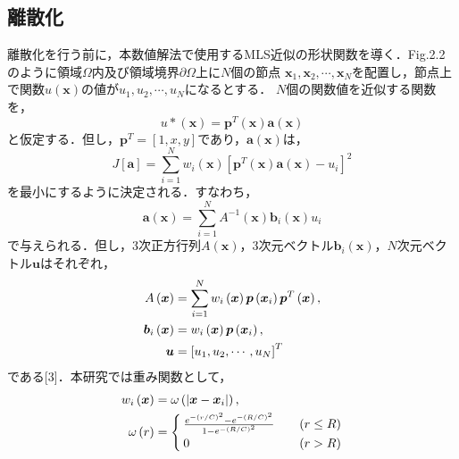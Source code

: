 \documentclass[twocolumn,head_space=15.0mm,foot_space=15.0mm,fleqn]{jlreq}
\numberwithin{equation}{section}
\begin{document}
\subsection{離散化}
離散化を行う前に，本数値解法で使用するMLS近似の形状関数を導く．Fig.2.2のように領域$\Omega$内及び領域境界$\partial \Omega$上に$N$個の節点
$\boldsymbol{x}_1, \boldsymbol{x}_2, \cdots, \boldsymbol{x}_N$を配置し，節点上で関数$u\left( \boldsymbol{x} \right)$の値が$u_1, u_2, \cdots, u_N$になるとする．
$N$個の関数値を近似する関数を，
\begin{equation}
	u* \left( \boldsymbol{x} \right) = \boldsymbol{p}^T \left( \boldsymbol{x} \right) \boldsymbol{a} \left( \boldsymbol{x} \right)
\end{equation}
と仮定する．但し，$\boldsymbol{p}^T = \left[ 1,x,y \right]$であり，$\boldsymbol{a} \left( \boldsymbol{x} \right)$は，
\begin{equation*}
	J \left[ \boldsymbol{a} \right] = \sum_{i=1}^N w_i \left( \boldsymbol{x} \right) 
	\left[ \boldsymbol{p}^T \left( \boldsymbol{x} \right) \boldsymbol{a} \left( \boldsymbol{x} \right) - u_i \right]^2
\end{equation*}
を最小にするように決定される．すなわち，
\begin{equation}
	\boldsymbol{a} \left( \boldsymbol{x} \right) = \sum_{i=1}^N A^{-1} \left( \boldsymbol{x} \right) \boldsymbol{b}_i \left( \boldsymbol{x} \right) u_i
\end{equation}
で与えられる．但し，3次正方行列$A\left( \boldsymbol{x} \right)$，3次元ベクトル$\boldsymbol{b}_i \left( \boldsymbol{x} \right)$，$N$次元ベクトル$\boldsymbol{u}$はそれぞれ，
\begin{align}
	A \left( \boldsymbol{x} \right) &= \sum_{i=1}^N w_i \left( \boldsymbol{x} \right) \boldsymbol{p} \left( \boldsymbol{x}_i \right) \boldsymbol{p}^T \left( \boldsymbol{x} \right), \\
	\boldsymbol{b}_i \left( \boldsymbol{x} \right) &= w_i \left( \boldsymbol{x} \right) \boldsymbol{p} \left( \boldsymbol{x}_i \right), \\
	\boldsymbol{u} &= \left[ u_1, u_2, \cdots, u_N \right]^T \notag
\end{align}
である[3]．本研究では重み関数として，
\begin{align}
	w_i \left( \boldsymbol{x} \right) &= \omega \left( | \boldsymbol{x} - \boldsymbol{x}_i| \right), \\
	\omega \left( r \right) &=
	\begin{cases}
		\frac{ e^{-(r / C)^2} - e^{-(R / C)^2} }{ 1 - e^{-(R / C)^2} } \quad & \left( r \le R \right) \\
		0 & \left( r > R \right)
	\end{cases} \notag
\end{align}
\end{document}
